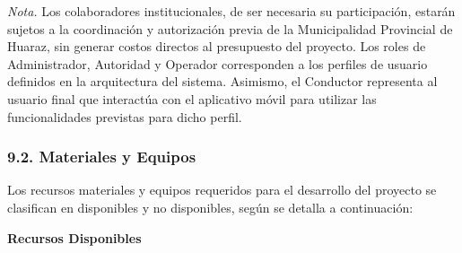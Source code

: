 \documentclass[12pt,a4paper]{article}
\begin{document}
\vspace{0.2cm}

\noindent\parbox{\textwidth}{
	\setlength{\parindent}{0pt}
	\small
	\textit{Nota.}
	Los colaboradores institucionales, de ser necesaria su participación, estarán sujetos a la coordinación y autorización previa de la Municipalidad Provincial de Huaraz, sin generar costos directos al presupuesto del proyecto. Los roles de Administrador, Autoridad y Operador corresponden a los perfiles de usuario definidos en la arquitectura del sistema. Asimismo, el Conductor representa al usuario final que interactúa con el aplicativo móvil para utilizar las funcionalidades previstas para dicho perfil.
}

\subsubsection*{9.2. Materiales y Equipos}

Los recursos materiales y equipos requeridos para el desarrollo del proyecto se clasifican en disponibles y no disponibles, según se detalla a continuación:

\vspace{0.3cm}
\noindent\textbf{Recursos Disponibles}
\end{document}
